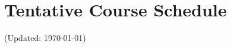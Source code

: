 \documentclass[12pt]{article}
\begin{document}





\section*{Tentative Course Schedule}

(Updated: \today)
\end{document}
